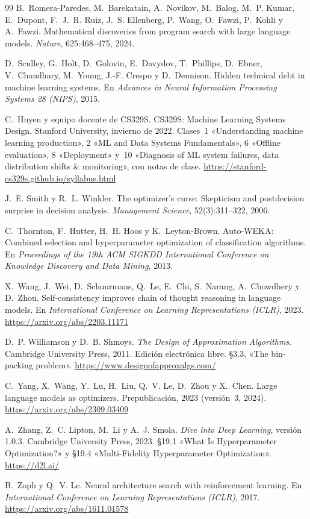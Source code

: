 \begin{thebibliography}{99}
B.~Romera-Paredes, M.~Barekatain, A.~Novikov, M.~Balog, M.~P. Kumar, E.~Dupont, F.~J.~R. Ruiz, J.~S. Ellenberg, P.~Wang, O.~Fawzi, P.~Kohli y A.~Fawzi.
\newblock Mathematical discoveries from program search with large language models.
\newblock \emph{Nature}, 625:468--475, 2024.

D.~Sculley, G.~Holt, D.~Golovin, E.~Davydov, T.~Phillips, D.~Ebner, V.~Chaudhary, M.~Young, J.-F. Crespo y D.~Dennison.
\newblock Hidden technical debt in machine learning systems.
\newblock En \emph{Advances in Neural Information Processing Systems 28 (NIPS)}, 2015.

C.~Huyen y equipo docente de CS329S.
\newblock CS329S: Machine Learning Systems Design.
\newblock Stanford University, invierno de 2022. Clases~1 «Understanding machine learning production», 2 «ML and Data Systems Fundamentals», 6 «Offline evaluation», 8 «Deployment» y~10 «Diagnosis of ML system failures, data distribution shifts \& monitoring», con notas de clase.
\newblock \url{https://stanford-cs329s.github.io/syllabus.html}

J.~E. Smith y R.~L. Winkler.
\newblock The optimizer's curse: Skepticism and postdecision surprise in decision analysis.
\newblock \emph{Management Science}, 52(3):311--322, 2006.

C.~Thornton, F.~Hutter, H.~H. Hoos y K.~Leyton-Brown.
\newblock Auto-WEKA: Combined selection and hyperparameter optimization of classification algorithms.
\newblock En \emph{Proceedings of the 19th ACM SIGKDD International Conference on Knowledge Discovery and Data Mining}, 2013.

X.~Wang, J.~Wei, D.~Schuurmans, Q.~Le, E.~Chi, S.~Narang, A.~Chowdhery y D.~Zhou.
\newblock Self-consistency improves chain of thought reasoning in language models.
\newblock En \emph{International Conference on Learning Representations (ICLR)}, 2023.
\newblock \url{https://arxiv.org/abs/2203.11171}

D.~P. Williamson y D.~B. Shmoys.
\newblock \emph{The Design of Approximation Algorithms}.
\newblock Cambridge University Press, 2011. Edición electrónica libre. §3.3, «The bin-packing problem».
\newblock \url{https://www.designofapproxalgs.com/}

C.~Yang, X.~Wang, Y.~Lu, H.~Liu, Q.~V. Le, D.~Zhou y X.~Chen.
\newblock Large language models as optimizers.
\newblock Prepublicación, 2023 (versión~3, 2024).
\newblock \url{https://arxiv.org/abs/2309.03409}

A.~Zhang, Z.~C. Lipton, M.~Li y A.~J. Smola.
\newblock \emph{Dive into Deep Learning}, versión 1.0.3.
\newblock Cambridge University Press, 2023. §19.1 «What Is Hyperparameter Optimization?» y §19.4 «Multi-Fidelity Hyperparameter Optimization».
\newblock \url{https://d2l.ai/}

B.~Zoph y Q.~V. Le.
\newblock Neural architecture search with reinforcement learning.
\newblock En \emph{International Conference on Learning Representations (ICLR)}, 2017.
\newblock \url{https://arxiv.org/abs/1611.01578}

\end{thebibliography}
